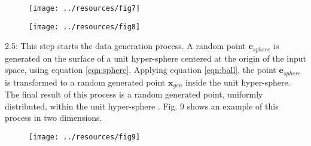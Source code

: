 \documentclass[parskip=full]{scrartcl}
\begin{document}
\begin{figure}[H]
	\centering
	\texttt{[image: ../resources/fig7]}
\end{figure}

\begin{figure}[H]
	\centering
	\texttt{[image: ../resources/fig8]}
\end{figure}

2.5: This step starts the data generation process. A random point \( \textbf{e}_{sphere} \) is generated on the surface of a unit hyper-sphere centered at the origin of the input space, using equation \eqref{eqn:sphere}. Applying equation \eqref{eqn:ball}, the point \( \textbf{e}_{sphere} \) is transformed to a random generated point \( \textbf{x}_{gen} \) inside the unit hyper-sphere. The final result of this process is a random generated point, uniformly distributed, within the unit hyper-sphere \cite{DasGupta2011}. Fig. 9 shows an example of this process in two dimensions.

\begin{figure}[H]
	\centering
	\texttt{[image: ../resources/fig9]}
\end{figure}
\end{document}
